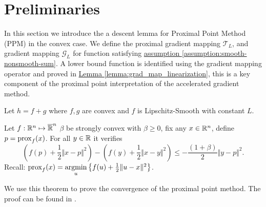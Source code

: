 \documentclass[12pt]{article}
\begin{document}
    

    
\section{Preliminaries}\label{sec:preliminaries}
    In this section we introduce the a descent lemma for Proximal Point Method (PPM) in the convex case. 
    We define the proximal gradient mapping $\mathcal T_L$, and gradient mapping $\mathcal G_L$ for function satisfying 
    \hyperref[assumption:smooth-nonsmooth-sum]
    {assumption \ref*{assumption:smooth-nonsmooth-sum}}. 
    A lower bound function is identified using the gradient mapping operator and proved in
    \hyperref[lemma:grad_map_linearization]{Lemma \ref*{lemma:grad_map_linearization}}, 
    this is a key component of the proximal point interpretation of the accelerated gradient method. 
    \begin{assumption}\label{assumption:smooth-nonsmooth-sum}
        Let $h = f + g$ where $f, g$ are convex and $f$ is Lipschitz-Smooth with constant $L$. 
    \end{assumption}
    
    \begin{theorem}\label{thm:ppm_descent_ineq}
        Let $f: \mathbb R^n \mapsto \overline {\mathbb R}^n$ $\beta$ be strongly convex with $\beta \ge 0$, fix any $x \in \mathbb R^n$, define $p = \operatorname{prox}_f(x)$.
        For all $y \in \mathbb R$ it verifies
        $$
            \left(f(p) + \frac{1}{2}\Vert x - p\Vert^2\right)
            - 
            \left(
                f(y) + \frac{1}{2}\Vert x - y\Vert^2 
            \right)
            \le 
            - \frac{(1 + \beta)}{2}\Vert y - p\Vert^2. 
        $$
        Recall: $\operatorname{prox}_f(x) = \mathop{\rm argmin}\limits_{u}\left\lbrace f(u) + \frac{1}{2}\Vert u - x\Vert^2 \right\rbrace$. 
    \end{theorem}
    \begin{remark}
        We use this theorem to prove the convergence of the proximal point method. 
        The proof can be found in \cite[theorem 12.26]{bauschke_convex_2017}. 
    \end{remark}
 
\end{document}
